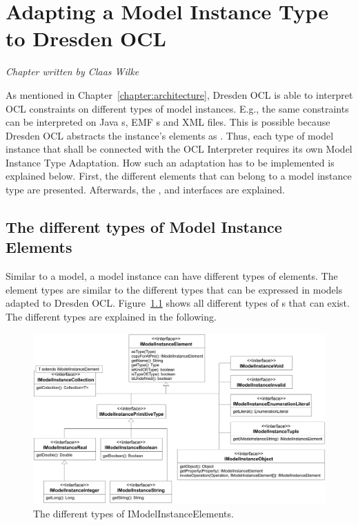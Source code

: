 \chapter{Adapting a Model Instance Type to Dresden OCL}
\label{chapter:modelInstanceTypeAdaptation}

\begin{flushright}
\textit{Chapter written by Claas Wilke}
\end{flushright}

As mentioned in Chapter~\ref{chapter:architecture}, Dresden OCL is able to
interpret \acs{OCL} constraints on different types of model instances. E.g., 
the same constraints can be interpreted on Java s, \acs{EMF}
s and \acs{XML} files. This is possible because Dresden OCL
abstracts the instance's elements as . Thus, each
type of model instance that shall be connected with the \acs{OCL} Interpreter 
requires its own Model Instance Type Adaptation. How such an adaptation has to
be implemented is explained below. First, the different elements that can 
belong to a model instance type are presented. Afterwards, the
,  and 
 interfaces are explained.


\section{The different types of Model Instance Elements}

Similar to a model, a model instance can have different types of elements. The
element types are similar to the different types that can be expressed in 
models adapted to Dresden OCL. 
Figure~\ref{pic:modelInstanceTypeAdaptation:typeHierarchy} shows all different 
types of s that can exist. The different types are
explained in the following.

\begin{figure}
	\centering
	\includegraphics[width=1.0\linewidth]{figures/modelInstanceTypeAdaptation/typeHierarchy}
	\caption{The different types of IModelInstanceElements.}
	\label{pic:modelInstanceTypeAdaptation:typeHierarchy}
\end{figure}


